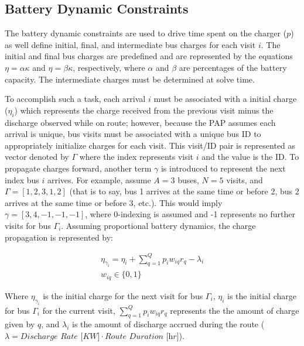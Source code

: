 \documentclass[letterpaper, 10pt, conference]{IEEEtran}
\begin{document}
\subsection{Battery Dynamic Constraints}
The battery dynamic constraints are used to drive time spent on the charger (\(p\)) as well define initial, final, and intermediate bus charges for each visit \(i\). The initial and final bus charges are predefined and are represented by the equations \(\eta = \alpha \kappa\) and \(\eta = \beta \kappa\), respectively, where \(\alpha\) and \(\beta\) are percentages of the battery capacity. The intermediate charges must be determined at solve time. 

To accomplish such a task, each arrival \(i\) must be associated with a initial charge (\(\eta_i\)) which represents the charge received from the previous visit minus the discharge observed while on route; however, because the PAP assumes each arrival is unique, bus visits must be associated with a unique bus ID to appropriately initialize charges for each visit. This visit/ID pair is represented as vector denoted by \(\Gamma\) where the index represents visit \(i\) and the value is the ID. To propagate charges forward, another term \(\gamma\) is introduced to represent the next index bus \(i\) arrives. For example, assume \(A = 3\) buses, \(N = 5\) visits, and \(\Gamma = [1,2,3,1,2]\) (that is to say, bus 1 arrives at the same time or before 2, bus 2 arrives at the same time or before 3, etc.). This would imply \(\gamma = [3,4,-1,-1,-1]\), where 0-indexing is assumed and -1 represents no further visits for bus \(\Gamma_i\). Assuming proportional battery dynamics, the charge propagation is represented by:

\begin{subequations}
\begin{align*}
    \eta_{\gamma_i} = \eta_i + \sum_{q=1}^Q p_i w_{iq} r_q - \lambda_i \\
    w_{iq} \in \{0,1\}
\end{align*}
\end{subequations}

Where \(\eta_{\gamma_i}\) is the initial charge for the next visit for bus \(\Gamma_i\), \(\eta_i\) is the initial charge for bus \(\Gamma_i\) for the current visit, \(\sum_{q=1}^Q p_i w_{iq} r_q\) represents the the amount of charge given by \(q\), and \(\lambda_i\) is the amount of discharge accrued during the route (\(\lambda = \textit{Discharge Rate [KW]}\cdot\textit{Route Duration [hr]}\)).
\end{document}
